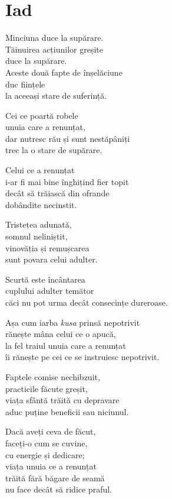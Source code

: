 
\chapter{Iad}


Minciuna duce la supărare.\\
Tăinuirea acțiunilor greșite\\
duce la supărare.\\
Aceste două fapte de înșelăciune\\
duc ființele\\
la aceeași stare de suferință.


Cei ce poartă robele\\
unuia care a renunțat,\\
dar nutresc rău și sunt nestăpâniți\\
trec la o stare de supărare.


Celui ce a renunțat\\
i-ar fi mai bine înghițind fier topit\\
decât să trăiască din ofrande\\
dobândite necinstit.


Tristețea adunată,\\
somnul neliniștit,\\
vinovăția și remușcarea\\
sunt povara celui adulter.


Scurtă este încântarea\\
cuplului adulter temător\\
căci nu pot urma decât consecințe dureroase.


Așa cum iarba \emph{kusa} prinsă nepotrivit\\
rănește mâna celui ce o apucă,\\
la fel traiul unuia care a renunțat\\
îi rănește pe cei ce se instruiesc nepotrivit.


Faptele comise nechibzuit,\\
practicile făcute greșit,\\
viața sfântă trăită cu depravare\\
aduc puține beneficii sau niciunul.


Dacă aveți ceva de făcut,\\
faceți-o cum se cuvine,\\
cu energie și dedicare;\\
viața unuia ce a renunțat\\
trăită fără băgare de seamă\\
nu face decât să ridice praful.


